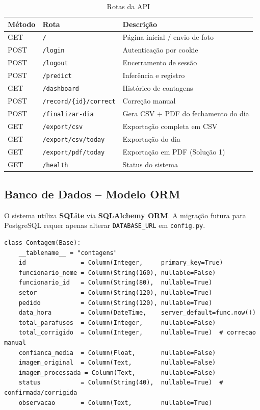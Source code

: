 \documentclass[12pt,a4paper]{article}
\begin{document}
\begin{table}[H]
  \centering
  \caption{Rotas da API}
  \label{tab:rotas}
  \begin{tabular}{lll}
    \toprule
    \textbf{M\'etodo} & \textbf{Rota} & \textbf{Descri\c{c}\~ao} \\
    \midrule
    GET  & \texttt{/}                      & P\'agina inicial / envio de foto \\
    POST & \texttt{/login}                 & Autentica\c{c}\~ao por cookie \\
    POST & \texttt{/logout}                & Encerramento de sess\~ao \\
    POST & \texttt{/predict}               & Infer\^encia e registro \\
    GET  & \texttt{/dashboard}             & Hist\'orico de contagens \\
    POST & \texttt{/record/\{id\}/correct} & Corre\c{c}\~ao manual \\
    POST & \texttt{/finalizar-dia}         & Gera CSV + PDF do fechamento do dia \\
    GET  & \texttt{/export/csv}            & Exporta\c{c}\~ao completa em CSV \\
    GET  & \texttt{/export/csv/today}      & Exporta\c{c}\~ao do dia \\
    GET  & \texttt{/export/pdf/today}      & Exporta\c{c}\~ao em PDF (Solu\c{c}\~ao 1) \\
    GET  & \texttt{/health}               & Status do sistema \\
    \bottomrule
  \end{tabular}
\end{table}

\subsection{Banco de Dados -- Modelo ORM}

O sistema utiliza \textbf{SQLite} via \textbf{SQLAlchemy ORM}. A migra\c{c}\~ao
futura para PostgreSQL requer apenas alterar \texttt{DATABASE\_URL} em
\texttt{config.py}.

\begin{lstlisting}[caption={Modelo de dados compartilhado (\texttt{app/models.py})}]
class Contagem(Base):
    __tablename__ = "contagens"
    id               = Column(Integer,     primary_key=True)
    funcionario_nome = Column(String(160), nullable=False)
    funcionario_id   = Column(String(80),  nullable=True)
    setor            = Column(String(120), nullable=True)
    pedido           = Column(String(120), nullable=True)
    data_hora        = Column(DateTime,    server_default=func.now())
    total_parafusos  = Column(Integer,     nullable=False)
    total_corrigido  = Column(Integer,     nullable=True)  # correcao manual
    confianca_media  = Column(Float,       nullable=False)
    imagem_original  = Column(Text,        nullable=False)
    imagem_processada = Column(Text,       nullable=False)
    status           = Column(String(40),  nullable=True)  # confirmada/corrigida
    observacao       = Column(Text,        nullable=True)
\end{lstlisting}
\end{document}
